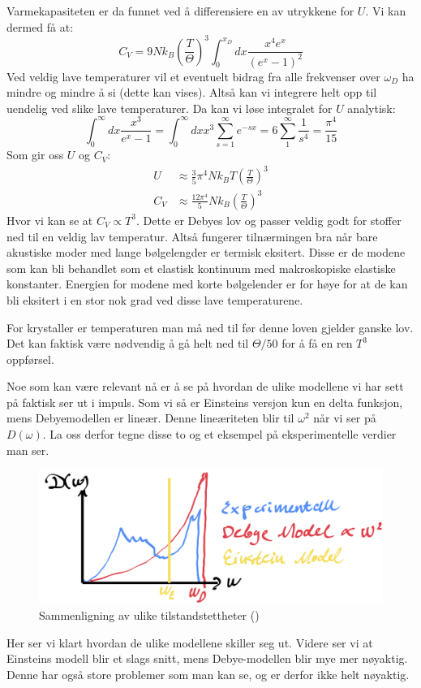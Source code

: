 \documentclass{article}
\begin{document}
Varmekapasiteten er da funnet ved å differensiere en av utrykkene for $U$. Vi kan dermed få at:
\begin{equation}
    C_V = 9 N k_B \left(\frac{T}{\Theta}\right)^3 \int_0^{x_D} dx \frac{x^4 e^x}{\left(e^x-1\right)^2}
\end{equation}
Ved veldig lave temperaturer vil et eventuelt bidrag fra alle frekvenser over $\omega_D$ ha mindre og mindre å si (dette kan vises). Altså kan vi integrere helt opp til uendelig ved slike lave temperaturer. Da kan vi løse integralet for $U$ analytisk:
\begin{equation}
    \int^\infty_0 dx \frac{x^3}{e^x-1} = \int^\infty_0 dx x^3 \sum^\infty_{s=1} e^{-sx} = 6 \sum_1^\infty \frac{1}{s^4} = \frac{\pi^4}{15}
\end{equation}
Som gir oss $U$ og $C_V$:
\begin{align}
    U &\approx \frac{3}{5} \pi^4 N k_B T \left(\frac{T}{\Theta}\right)^3 \\
    C_V &\approx \frac{12 \pi^4}{5} N k_B \left(\frac{T}{\Theta}\right)^3 
\end{align}
Hvor vi kan se at $C_V \propto T^3$. Dette er Debyes lov og passer veldig godt for stoffer ned til en veldig lav temperatur. Altså fungerer tilnærmingen bra når bare akustiske moder med lange bølgelengder er termisk eksitert. Disse er de modene som kan bli behandlet som et elastisk kontinuum med makroskopiske elastiske konstanter. Energien for modene med korte bølgelender er for høye for at de kan  bli eksitert i en stor nok grad ved disse lave temperaturene.

For krystaller er temperaturen man må ned til før denne loven gjelder ganske lov. Det kan faktisk være nødvendig å gå helt ned til $\Theta/50$ for å få en ren $T^3$ oppførsel.

Noe som kan være relevant nå er å se på hvordan de ulike modellene vi har sett på faktisk ser ut i impuls. Som vi så er Einsteins versjon kun en delta funksjon, mens Debyemodellen er lineær. Denne lineæriteten blir til $\omega^2$ når vi ser på $D(\omega)$. La oss derfor tegne disse to og et eksempel på eksperimentelle verdier man ser.
\begin{figure}[H]
    \centering
    \includegraphics[width=0.5\linewidth]{bilder/tilstandstetthetssammenligning.png}
    \caption{Sammenligning av ulike tilstandstettheter (\cite{Aleksander})}
    \label{fig:tilstandstetthetssammenligning}
\end{figure}
Her ser vi klart hvordan de ulike modellene skiller seg ut. Videre ser vi at Einsteins modell blir et slags snitt, mens Debye-modellen blir mye mer nøyaktig. Denne har også store problemer som man kan se, og er derfor ikke helt nøyaktig.
\end{document}
